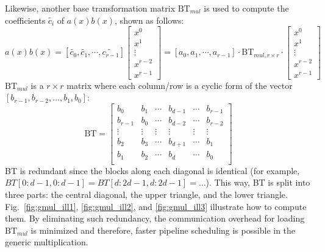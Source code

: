 \documentclass[runningheads]{llncs}
\begin{document}
Likewise, another base transformation matrix $\text{BT}_{mul}$ is used to compute the coefficients $\widetilde{c_{i}}$ of $a(x)b(x)$, shown as follows:
\[
a(x)b(x)= [\widetilde{c_{0}},\widetilde{c_{1}},\cdots,\widetilde{c_{r-1}}]\left[ \begin{array}{c}
x^{0} \\
x^{1} \\
\vdots\\
x^{r-2}\\
x^{r-1}
\end{array}
\right ]
=
[{a_{0}},{a_{1}},\cdots,{a_{r-1}}]
\cdot \text{BT}_{mul,r\times r} \cdot
\left[ \begin{array}{c}
x^{0} \\
x^{1} \\
\vdots\\
x^{r-2}\\
x^{r-1}
\end{array}
\right ]
\]
$\text{BT}_{mul}$ is a $r\times r$ matrix where each column/row is a cyclic form of the vector $[b_{r-1},b_{r-2},\ldots, b_{1},b_{0}]$:
\[
\text{BT} =
\left[ \begin{array}{cccccc}
b_{0}&b_{1}&\cdots&b_{d-1}&\cdots &b_{r-1} \\
b_{r-1}&b_{0}&\cdots&b_{d-2}&\cdots &b_{r-2} \\
\vdots&\vdots&\vdots&\vdots&\vdots&\vdots\\
b_{2}&b_{3}&\cdots&b_{d+1}&\cdots &b_{1} \\
b_{1}&b_{2}&\cdots&b_{d}&\cdots &b_{0} \\
\end{array}
\right ]
\]
BT is redundant since the blocks along each diagonal is identical (for example, $BT[0:d-1,0:d-1] = BT[d:2d-1,d:2d-1] = \ldots$). This way, BT is split into three parts: the central diagonal, the upper triangle, and the lower triangle. Fig.~\ref{fig:gmul_ill1}, \ref{fig:gmul_ill2}, and \ref{fig:gmul_ill3} illustrate how to compute them. By eliminating such redundancy, the communication overhead for loading $\text{BT}_{mul}$ is minimized and therefore, faster pipeline scheduling is possible in the generic multiplication.
\end{document}
